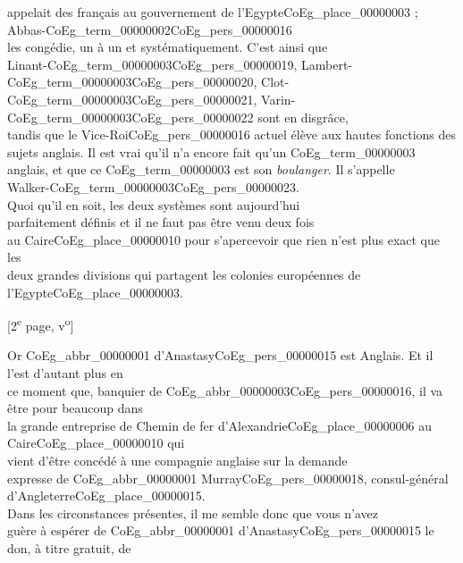 \documentclass{book}
\begin{document}
appelait des français au gouvernement de l’Egypte\gls{CoEg_place_00000003} ; Abbas-\Gls{CoEg_term_00000002}\gls{CoEg_pers_00000016}\\
les congédie, un à un et systématiquement. C’est ainsi que\\
Linant-\gls{CoEg_term_00000003}\gls{CoEg_pers_00000019}, Lambert-\gls{CoEg_term_00000003}\gls{CoEg_pers_00000020}, Clot-\gls{CoEg_term_00000003}\gls{CoEg_pers_00000021}, Varin-\gls{CoEg_term_00000003}\gls{CoEg_pers_00000022} sont en disgrâce,\\
tandis que le Vice-Roi\gls{CoEg_pers_00000016} actuel élève aux hautes fonctions des\\
sujets anglais. Il est vrai qu’il n’a encore fait qu’un \gls{CoEg_term_00000003}\\
anglais, et que ce \gls{CoEg_term_00000003} est son \textit{boulanger}. Il s’appelle\\
Walker-\gls{CoEg_term_00000003}\gls{CoEg_pers_00000023}.\\
\indent Quoi qu’il en soit, les deux systèmes sont aujourd’hui\\
parfaitement définis et il ne faut pas être venu deux fois\\
au Caire\gls{CoEg_place_00000010} pour s’apercevoir que rien n’est plus exact que les\\
deux grandes divisions qui partagent les colonies européennes
de l’Egypte\gls{CoEg_place_00000003}.
{\footnotesize \begin{center} [2\textsuperscript{e} page, v\textsuperscript{o}]\end{center}}
\indent Or \gls{CoEg_abbr_00000001} d’Anastasy\gls{CoEg_pers_00000015} est Anglais. Et il l’est d’autant plus en\\
ce moment que, banquier de \gls{CoEg_abbr_00000003}\gls{CoEg_pers_00000016}, il va être pour beaucoup dans\\
la grande entreprise de Chemin de fer d’Alexandrie\gls{CoEg_place_00000006} au Caire\gls{CoEg_place_00000010} qui\\
vient d’être concédé à une compagnie anglaise sur la demande\\
expresse de \gls{CoEg_abbr_00000001} Murray\gls{CoEg_pers_00000018}, consul-général d’Angleterre\gls{CoEg_place_00000015}.\\
\indent Dans les circonstances présentes, il me semble donc que vous n’avez\\
guère à espérer de \gls{CoEg_abbr_00000001} d’Anastasy\gls{CoEg_pers_00000015} le don, à titre gratuit, de\\
\end{document}
